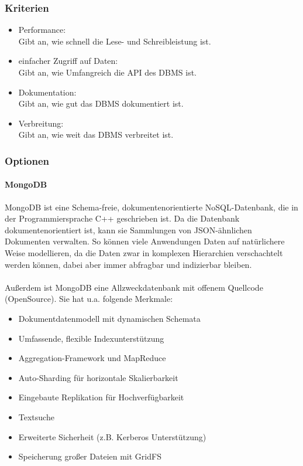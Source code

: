 \documentclass[11pt]{article}
\begin{document}
\subsubsection{Kriterien}

\begin{itemize}
	\item Performance: \\Gibt an, wie schnell die Lese- und Schreibleistung ist.
	\item einfacher Zugriff auf Daten: \\Gibt an, wie Umfangreich die API des DBMS ist.
	\item Dokumentation:\\ Gibt an, wie gut das DBMS dokumentiert ist.
	\item Verbreitung:\\ Gibt an, wie weit das DBMS verbreitet ist.
\end{itemize}

\subsubsection{Optionen}

\paragraph{MongoDB}
MongoDB ist eine Schema-freie, dokumentenorientierte NoSQL-Datenbank, die in der Programmiersprache C++ geschrieben ist. Da die Datenbank dokumentenorientiert ist, kann sie Sammlungen von JSON-\"ahnlichen Dokumenten verwalten. So k\"onnen viele Anwendungen Daten auf nat\"urlichere Weise modellieren, da die Daten zwar in komplexen Hierarchien verschachtelt werden k\"onnen, dabei aber immer abfragbar und indizierbar bleiben.\\\\
Au{\ss}erdem ist MongoDB eine Allzweckdatenbank mit offenem Quellcode (OpenSource).
Sie hat u.a. folgende Merkmale:

\begin{itemize}
	\item Dokumentdatenmodell mit dynamischen Schemata
	\item Umfassende, flexible Indexunterst\"utzung
	\item Aggregation-Framework und MapReduce
	\item Auto-Sharding f\"ur horizontale Skalierbarkeit
	\item Eingebaute Replikation f\"ur Hochverf\"ugbarkeit
	\item Textsuche
	\item Erweiterte Sicherheit (z.B. Kerberos Unterst\"utzung)
	\item Speicherung gro{\ss}er Dateien mit GridFS
\end{itemize}
\end{document}
